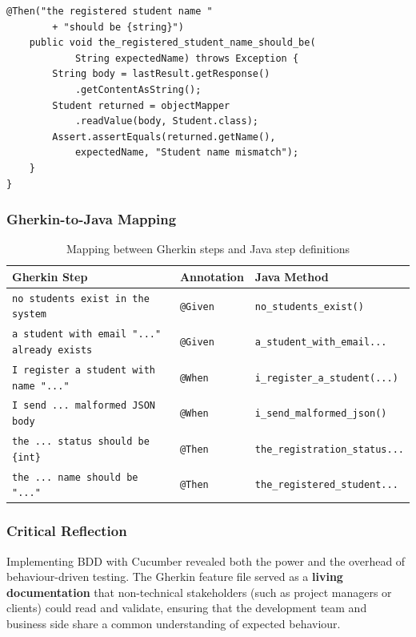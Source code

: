 \documentclass[12pt,a4paper]{article}
\begin{document}
\begin{lstlisting}[style=javastyle, caption={Cucumber step definitions -- \texttt{StudentSteps.java}}]
    @Then("the registered student name "
        + "should be {string}")
    public void the_registered_student_name_should_be(
            String expectedName) throws Exception {
        String body = lastResult.getResponse()
            .getContentAsString();
        Student returned = objectMapper
            .readValue(body, Student.class);
        Assert.assertEquals(returned.getName(),
            expectedName, "Student name mismatch");
    }
}
\end{lstlisting}

\subsubsection{Gherkin-to-Java Mapping}

\begin{table}[H]
\centering
\small
\begin{tabular}{lll}
    \toprule
    \textbf{Gherkin Step} & \textbf{Annotation} & \textbf{Java Method} \\
    \midrule
    \texttt{no students exist in the system} & \texttt{@Given} & \texttt{no\_students\_exist()} \\
    \texttt{a student with email "..." already exists} & \texttt{@Given} & \texttt{a\_student\_with\_email...} \\
    \texttt{I register a student with name "..."} & \texttt{@When} & \texttt{i\_register\_a\_student(...)} \\
    \texttt{I send ... malformed JSON body} & \texttt{@When} & \texttt{i\_send\_malformed\_json()} \\
    \texttt{the ... status should be \{int\}} & \texttt{@Then} & \texttt{the\_registration\_status...} \\
    \texttt{the ... name should be "..."} & \texttt{@Then} & \texttt{the\_registered\_student...} \\
    \bottomrule
\end{tabular}
\caption{Mapping between Gherkin steps and Java step definitions}
\end{table}

\subsubsection{Critical Reflection}

Implementing BDD with Cucumber revealed both the power and the overhead of behaviour-driven testing. The Gherkin feature file served as a \textbf{living documentation} that non-technical stakeholders (such as project managers or clients) could read and validate, ensuring that the development team and business side share a common understanding of expected behaviour.
\end{document}
